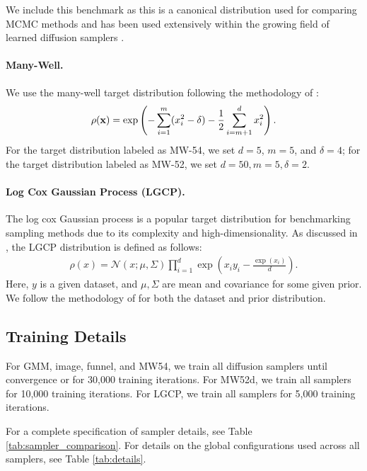 We include this benchmark as this is a canonical distribution used for comparing MCMC methods and has been used extensively within the growing field of learned diffusion samplers \citep{berner2024dis, zhang2022pis, vargas2023dds, richter2024improved}.

\paragraph{Many-Well.}
We use the many-well target distribution following the methodology of \citet{berner2024dis}:
\begin{equation*}
\rho({\mathbf{x}}) = \exp \left(-\sum_{i=1}^m (x_i^2 - \delta) - \frac{1}{2} \sum_{i=m+1}^d x_i^2 \right).
\end{equation*}
For the target distribution labeled as MW-54, we set $d=5$, $m=5$, and $\delta=4$; for the target distribution labeled as MW-52, we set $d=50, m=5, \delta=2$. 

\paragraph{Log Cox Gaussian Process (LGCP).}
The log cox Gaussian process is a popular target distribution for benchmarking sampling methods due to its complexity and high-dimensionality. 
As discussed in \citet{zhang2022pis, chen2025SCLD}, the LGCP distribution is defined as follows: 
\begin{align*}
    \rho(x) = \mathcal{N} (x; \mu, \Sigma) \prod_{i=1}^d \exp \left(x_i y_i -\frac{\exp(x_i)}{d}\right).
\end{align*}
Here, $y$ is a given dataset, and $\mu, \Sigma$ are mean and covariance for some given prior. 
We follow the methodology of \citet{zhang2022pis, arbel2021annealed} for both the dataset and prior distribution. 


\subsection{Training Details}
For GMM, image, funnel, and MW54, we train all diffusion samplers until convergence or for 30,000 training iterations. 
For MW52d, we train all samplers for 10,000 training iterations. For LGCP, we train all samplers for 5,000 training iterations. 

For a complete specification of sampler details, see Table \ref{tab:sampler_comparison}. 
For details on the global configurations used across all samplers, see Table \ref{tab:details}.

